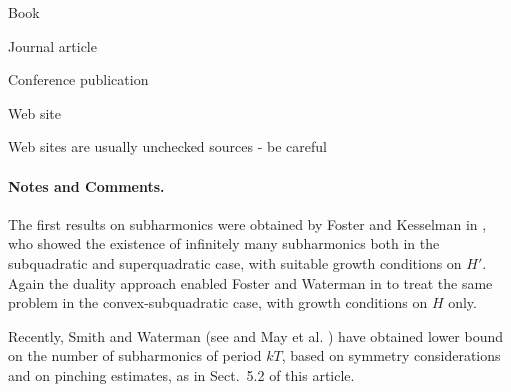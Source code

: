 \documentclass[lnicst,a4paper]{svmultln}
\begin{document}
Book

Journal article

Conference publication

Web site

Web sites are usually unchecked sources -
be careful





\paragraph{Notes and Comments.}
The first results on subharmonics were
obtained by Foster and Kesselman in \cite{fos:kes}, who showed the existence of
infinitely many subharmonics both in the subquadratic and superquadratic
case, with suitable growth conditions on $H'$. Again the duality
approach enabled Foster and Waterman in \cite{fos:kes:2} to treat the
same problem in the convex-subquadratic case, with growth conditions on
$H$ only.

Recently, Smith and Waterman (see \cite{smit:wat} and May et al. \cite{mes})
have obtained lower bound on the number of subharmonics of period $kT$,
based on symmetry considerations and on pinching estimates, as in
Sect.~5.2 of this article.




\end{document}
